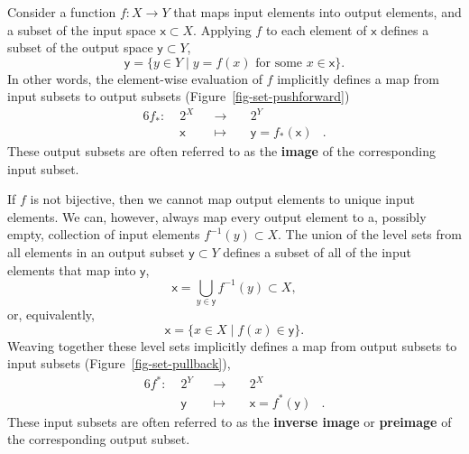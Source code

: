 \documentclass[
  letterpaper,
  DIV=11,
  numbers=noendperiod]{scrartcl}
\begin{document}
Consider a function \(f : X \rightarrow Y\) that maps input elements
into output elements, and a subset of the input space
\(\mathsf{x} \subset X\). Applying \(f\) to each element of
\(\mathsf{x}\) defines a subset of the output space
\(\mathsf{y} \subset Y\), \[
\mathsf{y}
=
\{ y \in Y \mid y = f(x) \text{ for some } x \in \mathsf{x} \}.
\] In other words, the element-wise evaluation of \(f\) implicitly
defines a map from input subsets to output subsets
(Figure~\ref{fig-set-pushforward}) \begin{alignat*}{6}
f_{*} :\; & 2^X & &\rightarrow& \; & 2^Y &
\\
& \mathsf{x} & &\mapsto& & \mathsf{y} = f_{*}(\mathsf{x}) &.
\end{alignat*} These output subsets are often referred to as the
\textbf{image} of the corresponding input subset.

If \(f\) is not bijective, then we cannot map output elements to unique
input elements. We can, however, always map every output element to a,
possibly empty, collection of input elements \(f^{-1}(y) \subset X\).
The union of the level sets from all elements in an output subset
\(\mathsf{y} \subset Y\) defines a subset of all of the input elements
that map into \(\mathsf{y}\), \[
\mathsf{x} = \bigcup_{y \in \mathsf{y}} f^{-1}(y) \subset X,
\] or, equivalently, \[
\mathsf{x} = \{ x \in X \mid f(x) \in \mathsf{y} \}.
\] Weaving together these level sets implicitly defines a map from
output subsets to input subsets (Figure~\ref{fig-set-pullback}),
\begin{alignat*}{6}
f^{*} :\; & 2^Y & &\rightarrow& \; & 2^X &
\\
& \mathsf{y} & &\mapsto& & \mathsf{x} = f^{*}(\mathsf{y}) &.
\end{alignat*} These input subsets are often referred to as the
\textbf{inverse image} or \textbf{preimage} of the corresponding output
subset.
\end{document}
